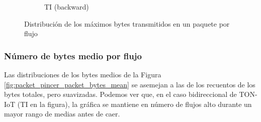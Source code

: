 \begin{figure}[H]
\begin{subfigure}[b]{0.26\textwidth}
        \caption{TI (backward)}
    \end{subfigure}
    \hfill
       \caption{Distribución de los máximos bytes transmitidos en un paquete por flujo}
       \label{fig:packet_pincer_packet_bytes_min}
\end{figure}

\subsubsection{Número de bytes medio por flujo}

Las distribuciones de los bytes medios de la Figura \ref{fig:packet_pincer_packet_bytes_mean} se asemejan a las de los recuentos de los bytes totales, pero suavizadas. Podemos ver que, en el caso bidireccional de TON-IoT (TI en la figura), la gráfica se mantiene en número de flujos alto durante un mayor rango de medias antes de caer.

